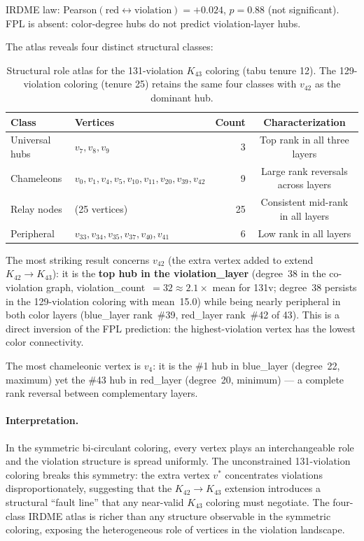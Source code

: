 \documentclass[11pt]{article}
\begin{document}
IRDME law: Pearson$(\text{red} \leftrightarrow \text{violation}) = +0.024$,
$p = 0.88$ (not significant). FPL is absent: color-degree hubs do not predict
violation-layer hubs.

The atlas reveals four distinct structural classes:

\begin{table}[h]
\centering
\begin{tabular}{llrc}
\toprule
Class & Vertices & Count & Characterization \\
\midrule
Universal hubs & $v_7, v_8, v_9$ & 3 & Top rank in all three layers \\
Chameleons     & $v_0, v_1, v_4, v_5, v_{10}, v_{11}, v_{20}, v_{39}, v_{42}$ & 9 & Large rank reversals across layers \\
Relay nodes    & (25 vertices) & 25 & Consistent mid-rank in all layers \\
Peripheral     & $v_{33}, v_{34}, v_{35}, v_{37}, v_{40}, v_{41}$ & 6 & Low rank in all layers \\
\bottomrule
\end{tabular}
\caption{Structural role atlas for the 131-violation $K_{43}$ coloring (tabu tenure 12). The 129-violation coloring (tenure 25) retains the same four classes with $v_{42}$ as the dominant hub.}
\label{tab:atlas}
\end{table}

The most striking result concerns $v_{42}$ (the extra vertex added to extend
$K_{42} \to K_{43}$): it is the \textbf{top hub in the violation\_layer}
(degree~38 in the co-violation graph, violation\_count~$= 32 \approx 2.1\times$ mean for 131v;
degree~38 persists in the 129-violation coloring with mean~15.0)
while being nearly peripheral in both color layers
(blue\_layer rank~\#39, red\_layer rank~\#42 of 43).
This is a direct inversion of the FPL prediction: the highest-violation
vertex has the lowest color connectivity.

The most chameleonic vertex is $v_4$: it is the \#1 hub in blue\_layer
(degree~22, maximum) yet the \#43 hub in red\_layer (degree~20, minimum) ---
a complete rank reversal between complementary layers.

\paragraph{Interpretation.}
In the symmetric bi-circulant coloring, every vertex plays an interchangeable role
and the violation structure is spread uniformly.
The unconstrained 131-violation coloring breaks this symmetry: the extra
vertex $v^*$ concentrates violations disproportionately, suggesting that the
$K_{42} \to K_{43}$ extension introduces a structural ``fault line'' that
any near-valid $K_{43}$ coloring must negotiate.
The four-class IRDME atlas is richer than any structure observable in the
symmetric coloring, exposing the heterogeneous role of vertices in the
violation landscape.
\end{document}

